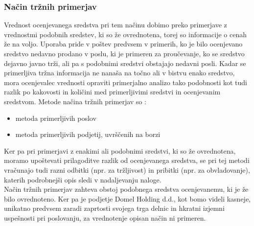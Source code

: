 \documentclass[12pt,a4paper]{amsart}
\theoremstyle{definition} %
\theoremstyle{plain} %
\begin{document}
\subsubsection{Način tržnih primerjav}
Vrednost ocenjevanega sredstva pri tem načinu dobimo preko primerjave z vrednostmi podobnih sredstev, ki so že ovrednotena, torej so informacije o cenah že na voljo. Uporaba pride v poštev predvsem v primerih, ko je bilo ocenjevano sredstvo nedavno prodano v poslu, ki je primeren za proučevanje, ko se sredstvo dejavno javno trži, ali pa s podobnimi sredstvi obstajajo nedavni posli. Kadar se primerljiva tržna informacija ne nanaša na točno ali v bistvu enako sredstvo, mora ocenjevalec vrednosti opraviti primerjalno analizo tako podobnosti kot tudi razlik po kakovosti in količini med primerljivimi sredstvi in ocenjevanim sredstvom. 
Metode načina tržnih primerjav so :
\begin{itemize}
\item metoda primerljivih poslov
\item metoda primerljivih podjetij, uvrščenih na borzi
\end{itemize}
Ker pa pri primerjavi z enakimi ali podobnimi sredstvi, ki so že ovrednotena, moramo upoštevati prilagoditve razlik od ocenjevanega sredstva, se pri tej metodi vračunajo tudi razni odbitki (npr. za tržljivost) in pribitki (npr. za obvladovanje), katerih podrobnejši opis sledi v nadaljevanju naloge.\\
Način tržnih primerjav zahteva obstoj podobnega sredstva ocenjevanemu, ki je že bilo ovrednoteno. Ker pa je podjetje Domel Holding d.d., kot bomo videli kasneje, unikatno predvsem zaradi zaprtosti svojega trga delnic in hkratni izjemni uspešnosti pri poslovanju, za vrednotenje opisan način ni primeren. 
\end{document}
